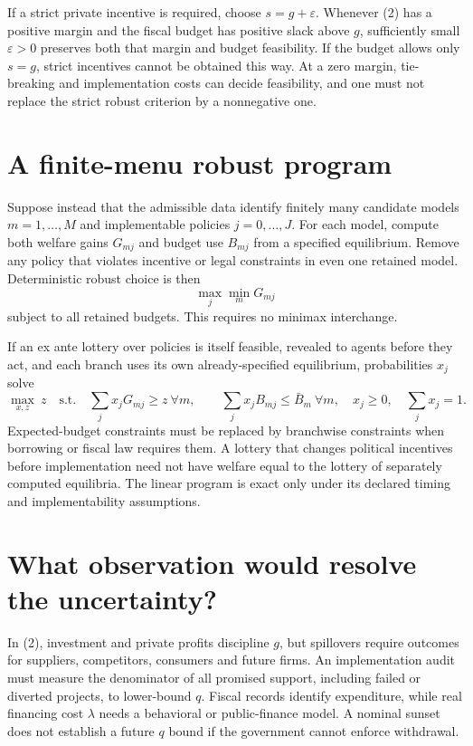 \documentclass[11pt]{article}
\begin{document}
If a strict private incentive is required, choose $s=g+\varepsilon$. Whenever (2) has a positive margin and the fiscal budget has positive slack above $g$, sufficiently small $\varepsilon>0$ preserves both that margin and budget feasibility. If the budget allows only $s=g$, strict incentives cannot be obtained this way. At a zero margin, tie-breaking and implementation costs can decide feasibility, and one must not replace the strict robust criterion by a nonnegative one.

\section*{A finite-menu robust program}
Suppose instead that the admissible data identify finitely many candidate models $m=1,\ldots,M$ and implementable policies $j=0,\ldots,J$. For each model, compute both welfare gains $G_{mj}$ and budget use $B_{mj}$ from a specified equilibrium. Remove any policy that violates incentive or legal constraints in even one retained model. Deterministic robust choice is then
\[
 \max_{j}\min_m G_{mj}
\]
subject to all retained budgets. This requires no minimax interchange.

If an ex ante lottery over policies is itself feasible, revealed to agents before they act, and each branch uses its own already-specified equilibrium, probabilities $x_j$ solve
\[
 \max_{x,z}\ z\quad\text{s.t.}\quad
 \sum_jx_jG_{mj}\geq z\ \forall m,\qquad
 \sum_jx_jB_{mj}\leq\bar B_m\ \forall m,\quad
 x_j\geq0,\quad\sum_jx_j=1.
\]
Expected-budget constraints must be replaced by branchwise constraints when borrowing or fiscal law requires them. A lottery that changes political incentives before implementation need not have welfare equal to the lottery of separately computed equilibria. The linear program is exact only under its declared timing and implementability assumptions.

\section*{What observation would resolve the uncertainty?}
In (2), investment and private profits discipline $g$, but spillovers require outcomes for suppliers, competitors, consumers and future firms. An implementation audit must measure the denominator of all promised support, including failed or diverted projects, to lower-bound $q$. Fiscal records identify expenditure, while real financing cost $\lambda$ needs a behavioral or public-finance model. A nominal sunset does not establish a future $q$ bound if the government cannot enforce withdrawal.
\end{document}
